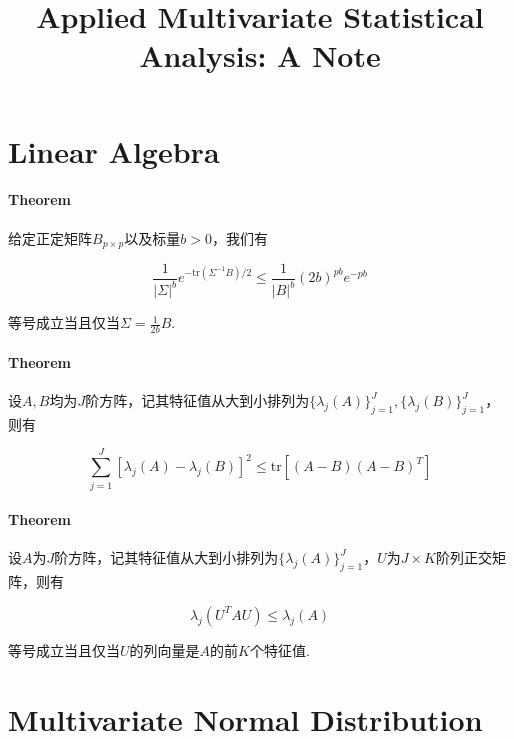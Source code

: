 \documentclass[a4paper,11pt]{article}
\begin{document}
\title{Applied Multivariate Statistical Analysis: A Note}
\maketitle

\section{Linear Algebra}
\paragraph{Theorem} 
给定正定矩阵$B_{p\times p }$以及标量$b > 0$，我们有

\begin{displaymath}
\frac{1}{|\Sigma|^b}e^{-\textrm{tr}(\Sigma^{-1}B) / 2} \leq \frac{1}{|B|^b}(2b)^{pb}e^{-pb}
\end{displaymath}

等号成立当且仅当$\Sigma = \frac{1}{2b}B$. 

\paragraph{Theorem}
设$A, B$均为$J$阶方阵，记其特征值从大到小排列为$\{\lambda_j(A)\}_{j=1}^J, \{\lambda_j(B)\}_{j=1}^J$，则有

\begin{displaymath}
\sum_{j=1}^J [\lambda_j(A)−\lambda_j(B)]^2 \leq \textrm{tr}[(A−B)(A−B)^T]
\end{displaymath}

\paragraph{Theorem}
设$A$为$J$阶方阵，记其特征值从大到小排列为$\{\lambda_j(A)\}_{j=1}^J$，$U$为$J\times K$阶列正交矩阵，则有

\begin{displaymath}
\lambda_j(U^TAU) \leq \lambda_j(A)
\end{displaymath}

等号成立当且仅当$U$的列向量是$A$的前$K$个特征值. 


\section{Multivariate Normal Distribution}
\end{document}
